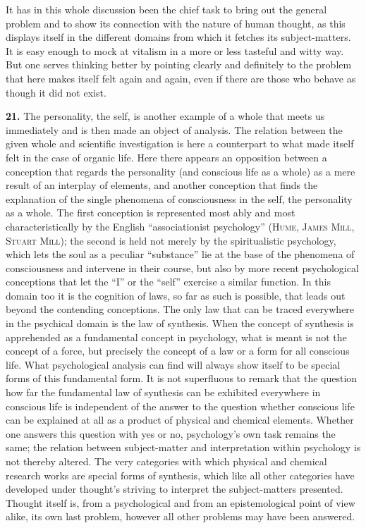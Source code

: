 \documentclass[12pt]{book}
\newcommand{\hnum}[1]{\textbf{#1.}\enspace}
\newcommand{\opage}[1]{\marginnote{\footnotesize\textit{[#1]}}}
\begin{document}
It has in this whole discussion been the chief task to bring out the general \opage{56}problem and
to show its connection with the nature of human thought, as this displays itself in the
different domains from which it fetches its subject-matters. It is easy enough to mock
at vitalism in a more or less tasteful and witty way. But one serves thinking better by
pointing clearly and definitely to the problem that here makes itself felt again and
again, even if there are those who behave as though it did not exist.

\hnum{21} The personality, the self, is another example of a whole that meets us
immediately and is then made an object of analysis. The relation between the given
whole and scientific investigation is here a counterpart to what made itself felt in
the case of organic life. Here there appears an opposition between a conception that
regards the personality (and conscious life as a whole) as a mere result of an
interplay of elements, and another conception that finds the explanation of the
single phenomena of consciousness in the self, the personality as a whole. The first
conception is represented most ably and most characteristically by the English
``associationist psychology'' (\textsc{Hume}, \textsc{James Mill}, \textsc{Stuart
Mill}); the second is held not merely by the spiritualistic psychology, which lets
the soul as a peculiar ``substance'' lie at the base of the phenomena of
consciousness and intervene in their course, but also by more recent psychological
conceptions that let the ``I'' or the ``self'' exercise a similar function. In this
domain too it is the cognition of laws, so far as such is possible, that leads out
beyond the contending conceptions. The only law that can be traced everywhere in the
psychical domain is the law of synthesis. When the concept of synthesis is
apprehended as a fundamental concept in psychology, what is meant is not the concept
of a force, but precisely the concept of a law or a form for all conscious life. What
psychological analysis can find will always show itself to be special forms of this
fundamental form. It is not superfluous to remark that the question how far the
fundamental law of synthesis can be exhibited everywhere in conscious life is
independent of the answer to the question whether conscious life can be explained at
all as a product of physical and chemical elements. Whether one answers this question
with yes or no, psychology's own task remains the same; the relation between
subject-matter and interpretation within psychology is not thereby altered. The very
categories with which physical and chemical research works are special forms of
synthesis, which like all other categories have developed under thought's striving to
interpret the subject-matters presented. Thought itself is, from a psychological and
from an epistemological point of view alike, its own last problem, however all other
problems may have been answered.
\end{document}
